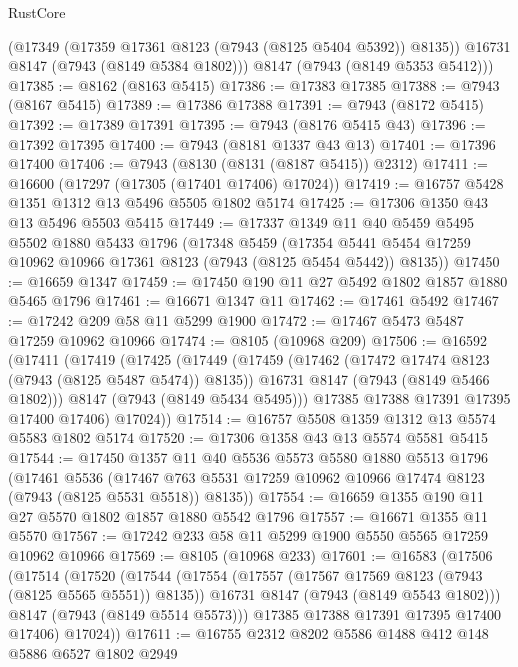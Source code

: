 \begin{lexlean}{RustCore}
\begin{coremodule}
        (@17349 (@17359 @17361 @8123 (@7943 (@8125 @5404 @5392)) @8135))
        @16731
        @8147
        (@7943 (@8149 @5384 @1802)))
      @8147
      (@7943 (@8149 @5353 @5412)))
@17385 := @8162 (@8163 @5415)
@17386 := @17383 @17385
@17388 := @7943 (@8167 @5415)
@17389 := @17386 @17388
@17391 := @7943 (@8172 @5415)
@17392 := @17389 @17391
@17395 := @7943 (@8176 @5415 @43)
@17396 := @17392 @17395
@17400 := @7943 (@8181 @1337 @43 @13)
@17401 := @17396 @17400
@17406 := @7943 (@8130 (@8131 (@8187 @5415)) @2312)
@17411 := @16600 (@17297 (@17305 (@17401 @17406) @17024))
@17419 := @16757 @5428 @1351 @1312 @13 @5496 @5505 @1802 @5174
@17425 := @17306 @1350 @43 @13 @5496 @5503 @5415
@17449 := @17337
    @1349
    @11
    @40
    @5459
    @5495
    @5502
    @1880
    @5433
    @1796
    (@17348
      @5459
      (@17354 @5441 @5454 @17259 @10962 @10966 @17361 @8123 (@7943 (@8125 @5454 @5442)) @8135))
@17450 := @16659 @1347
@17459 := @17450 @190 @11 @27 @5492 @1802 @1857 @1880 @5465 @1796
@17461 := @16671 @1347 @11
@17462 := @17461 @5492
@17467 := @17242 @209 @58 @11 @5299 @1900
@17472 := @17467 @5473 @5487 @17259 @10962 @10966
@17474 := @8105 (@10968 @209)
@17506 := @16592
    (@17411
      (@17419
        (@17425
          (@17449
            (@17459
              (@17462 (@17472 @17474 @8123 (@7943 (@8125 @5487 @5474)) @8135))
              @16731
              @8147
              (@7943 (@8149 @5466 @1802)))
            @8147
            (@7943 (@8149 @5434 @5495)))
          @17385
          @17388
          @17391
          @17395
          @17400
          @17406)
        @17024))
@17514 := @16757 @5508 @1359 @1312 @13 @5574 @5583 @1802 @5174
@17520 := @17306 @1358 @43 @13 @5574 @5581 @5415
@17544 := @17450
    @1357
    @11
    @40
    @5536
    @5573
    @5580
    @1880
    @5513
    @1796
    (@17461
      @5536
      (@17467 @763 @5531 @17259 @10962 @10966 @17474 @8123 (@7943 (@8125 @5531 @5518)) @8135))
@17554 := @16659 @1355 @190 @11 @27 @5570 @1802 @1857 @1880 @5542 @1796
@17557 := @16671 @1355 @11 @5570
@17567 := @17242 @233 @58 @11 @5299 @1900 @5550 @5565 @17259 @10962 @10966
@17569 := @8105 (@10968 @233)
@17601 := @16583
    (@17506
      (@17514
        (@17520
          (@17544
            (@17554
              (@17557 (@17567 @17569 @8123 (@7943 (@8125 @5565 @5551)) @8135))
              @16731
              @8147
              (@7943 (@8149 @5543 @1802)))
            @8147
            (@7943 (@8149 @5514 @5573)))
          @17385
          @17388
          @17391
          @17395
          @17400
          @17406)
        @17024))
@17611 := @16755 @2312 @8202 @5586 @1488 @412 @148 @5886 @6527 @1802 @2949

\end{coremodule}
\end{lexlean}
